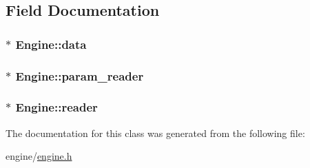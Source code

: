 \subsection{Field Documentation}
\hypertarget{classEngine_a92dad538992bac19762f6cc2a754962a}{
\subsubsection[{data}]{$\ast$ {\bf Engine::data}}}
\label{classEngine_a92dad538992bac19762f6cc2a754962a}
\hypertarget{classEngine_aa2b8bf8e8a8854d1eacda6bb1a4f4f37}{
\subsubsection[{param\_\-reader}]{$\ast$ {\bf Engine::param\_\-reader}}}
\label{classEngine_aa2b8bf8e8a8854d1eacda6bb1a4f4f37}
\hypertarget{classEngine_ab8f643f38543ba32dd856f15aa7899e8}{
\subsubsection[{reader}]{$\ast$ {\bf Engine::reader}}}
\label{classEngine_ab8f643f38543ba32dd856f15aa7899e8}


The documentation for this class was generated from the following file:\begin{DoxyCompactItemize}
\item 
engine/\hyperlink{engine_8h}{engine.h}\end{DoxyCompactItemize}
